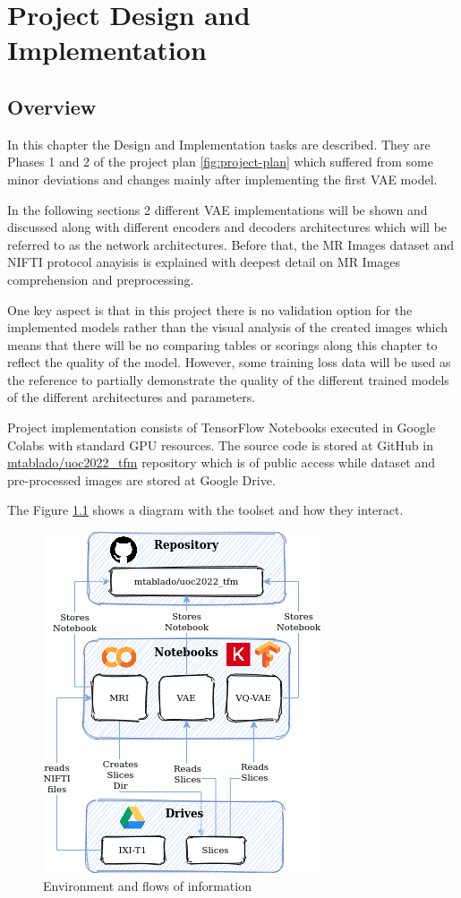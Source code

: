 \chapter{Project Design and Implementation}

\section{Overview}
\label{sec:imploverview}
In this chapter the Design and Implementation tasks are described. They are Phases 1 and 2 of the project plan \ref{fig:project-plan} which suffered from some minor deviations and changes mainly after implementing the first VAE model.

In the following sections 2 different VAE implementations will be shown and discussed along with different encoders and decoders architectures which will be referred to as the network architectures. Before that, the MR Images dataset and NIFTI protocol anayisis is explained with deepest detail on MR Images comprehension and preprocessing.

One key aspect is that in this project there is no validation option for the implemented models rather than the visual analysis of the created images which means that there will be no comparing tables or scorings along this chapter to reflect the quality of the model. However, some  training loss data will be used as the reference to partially demonstrate the quality of the different trained models of the different architectures and parameters.   

Project implementation consists of TensorFlow Notebooks executed in Google Colabs with standard GPU resources. The source code is stored at GitHub in \href{https://github.com/mtablado/uoc2022_tfm}{mtablado/uoc2022\_tfm} repository which is of public access while  dataset and pre-processed images are stored at Google Drive.

The Figure \ref{fig:environment} shows a diagram with the toolset and how they interact.

\begin{figure}[ht]
    \centering
    \includegraphics[]{images/tfm-environment.png}
    \caption[Environment and flows of information]{Environment and flows of information}
    \label{fig:environment}
\end{figure}

